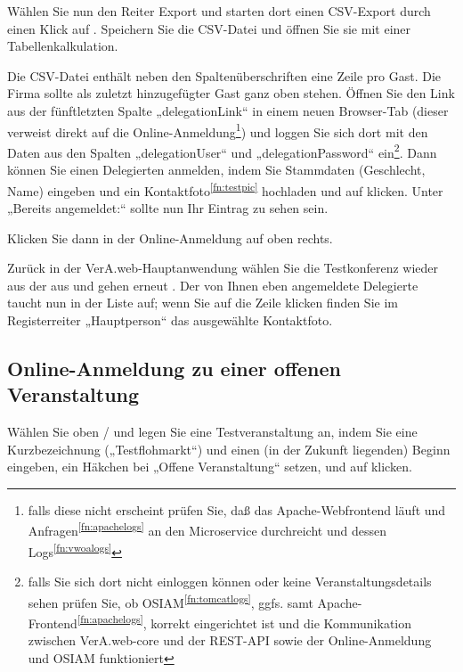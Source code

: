 \documentclass{tarentanleitung}
\begin{document}
Wählen Sie nun den Reiter Export und starten dort einen CSV-Export
durch einen Klick auf .
Speichern Sie die CSV-Datei und öffnen Sie sie mit einer Tabellenkalkulation.

Die CSV-Datei enthält neben den Spaltenüberschriften eine Zeile pro Gast.
Die Firma sollte als zuletzt hinzugefügter Gast ganz oben stehen.
Öffnen Sie den Link aus der fünftletzten Spalte
„delegationLink“ in einem neuen Browser-Tab
(dieser verweist direkt auf die Online-Anmeldung\Hair\footnote{falls
diese nicht erscheint prüfen Sie, daß das Apache-Webfrontend läuft und
Anfragen\Hair\textsuperscript{\ref{fn:apachelogs}} an den Microservice
durchreicht und dessen Logs\Hair\textsuperscript{\ref{fn:vwoalogs}}})
und loggen Sie sich dort mit den Daten aus den Spalten „delegationUser“
und „delegationPassword“ ein\Hair\footnote{\label{fn:inttst-osiam}falls Sie sich
dort nicht einloggen können oder keine Veranstaltungsdetails sehen
prüfen Sie, ob OSIAM\Hair\textsuperscript{\ref{fn:tomcatlogs}}, ggfs.
samt Apache-Frontend\Hair\textsuperscript{\ref{fn:apachelogs}}, korrekt
eingerichtet ist und die Kommunikation zwischen VerA.web-core und der
REST-API sowie der Online-Anmeldung und OSIAM funktioniert}. Dann können
Sie einen Delegierten anmelden, indem Sie Stammdaten (Geschlecht, Name)
eingeben und ein Kontaktfoto\Hair\textsuperscript{\ref{fn:testpic}}
hochladen und auf  klicken.
Unter „Bereits angemeldet:“ sollte nun Ihr Eintrag zu sehen sein.

Klicken Sie dann in der Online-Anmeldung auf 
oben rechts.

Zurück in der VerA.web-Hauptanwendung wählen Sie die Testkonferenz
wieder aus der  aus und gehen
erneut . Der von Ihnen eben angemeldete
Delegierte taucht nun in der Liste auf; wenn Sie auf die Zeile klicken
finden Sie im Registerreiter „Hauptperson“ das ausgewählte Kontaktfoto.

\subsection{Online-Anmeldung zu einer offenen Veranstaltung}

Wählen Sie oben  /  und legen Sie eine Testveranstaltung an, indem Sie eine
Kurzbezeichnung („Testflohmarkt“) und einen (in der Zukunft liegenden)
Beginn eingeben, ein Häkchen bei „Offene Veranstaltung“ setzen, und
auf  klicken.
\end{document}
